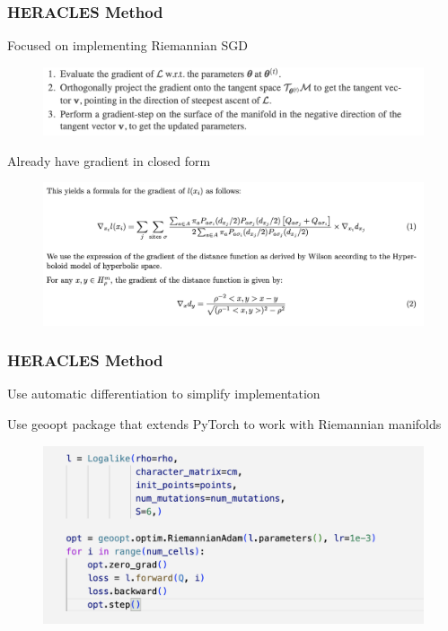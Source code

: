 \documentclass[
	11pt, %
]{beamer}
\begin{document}

\begin{frame}
	\frametitle{HERACLES Method}

	Focused on implementing Riemannian SGD
	\begin{figure}
		\includegraphics[width=0.9 \linewidth]{riemmanian-sgd.png}
	\end{figure}
	\pause
	Already have gradient in closed form

	\begin{figure}
		\includegraphics[width=0.8 \linewidth]{gradient.png}
	\end{figure}
\end{frame}


\begin{frame}
	\frametitle{HERACLES Method}
	Use automatic differentiation to simplify implementation
	\bigskip

	Use geoopt package that extends PyTorch to work with Riemannian manifolds

	\begin{figure}
		\includegraphics[width=0.8 \linewidth]{training-code.png}
	\end{figure}
\end{frame}
\end{document}
